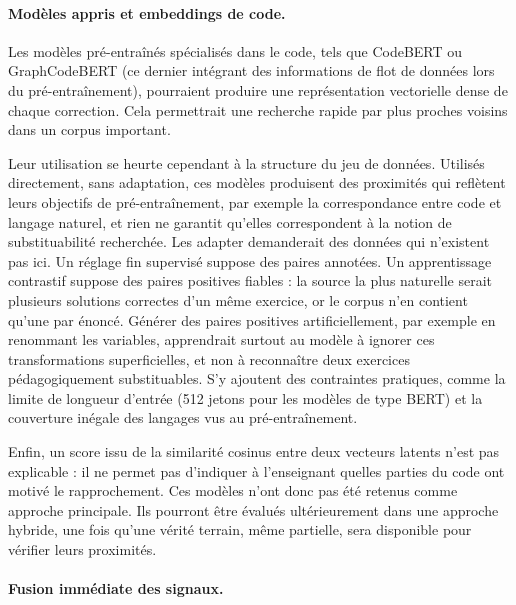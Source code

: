\paragraph{Modèles appris et embeddings de code.}

Les modèles pré-entraînés spécialisés dans le code, tels que CodeBERT ou
GraphCodeBERT (ce dernier intégrant des informations de flot de données lors
du pré-entraînement), pourraient produire une représentation vectorielle
dense de chaque correction. Cela permettrait une recherche rapide par plus
proches voisins dans un corpus important.

Leur utilisation se heurte cependant à la structure du jeu de données.
Utilisés directement, sans adaptation, ces modèles produisent des proximités
qui reflètent leurs objectifs de pré-entraînement, par exemple la
correspondance entre code et langage naturel, et rien ne garantit qu'elles
correspondent à la notion de substituabilité recherchée. Les adapter
demanderait des données qui n'existent pas ici. Un réglage fin supervisé
suppose des paires annotées. Un apprentissage contrastif suppose des paires
positives fiables : la source la plus naturelle serait plusieurs solutions
correctes d'un même exercice, or le corpus n'en contient qu'une par énoncé.
Générer des paires positives artificiellement, par exemple en renommant les
variables, apprendrait surtout au modèle à ignorer ces transformations
superficielles, et non à reconnaître deux exercices pédagogiquement
substituables. S'y ajoutent des contraintes pratiques, comme la limite de
longueur d'entrée (512 jetons pour les modèles de type BERT) et la couverture
inégale des langages vus au pré-entraînement.

Enfin, un score issu de la similarité cosinus entre deux vecteurs latents
n'est pas explicable : il ne permet pas d'indiquer à l'enseignant quelles
parties du code ont motivé le rapprochement. Ces modèles n'ont donc pas été
retenus comme approche principale. Ils pourront être évalués ultérieurement
dans une approche hybride, une fois qu'une vérité terrain, même partielle,
sera disponible pour vérifier leurs proximités.

\paragraph{Fusion immédiate des signaux.}

